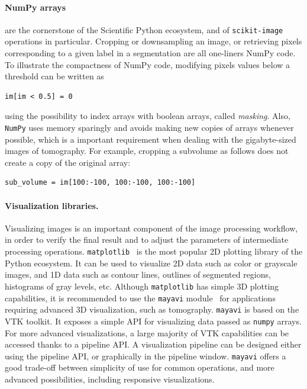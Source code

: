 \documentclass[twocolumn]{bmcart}%
\begin{document}
\paragraph{NumPy arrays} are the cornerstone of the Scientific Python
ecosystem, and of \texttt{scikit-image} operations in particular.
Cropping or downsampling an image, or retrieving pixels corresponding to
a given label in a segmentation are all one-liners NumPy code. To
illustrate the compactness of NumPy code, modifying pixels values below a
threshold can be written as
\begin{lstlisting}
im[im < 0.5] = 0
\end{lstlisting}
using the possibility to index arrays with boolean arrays, called
\emph{masking}. Also, \texttt{NumPy} uses memory sparingly and avoids
making new copies of arrays whenever possible, which is a important
requirement when dealing with the gigabyte-sized images of tomography.
For example, cropping a subvolume as follows does not create a copy of the
original array:
\begin{lstlisting}
sub_volume = im[100:-100, 100:-100, 100:-100]
\end{lstlisting}



\paragraph{Visualization libraries.}

Visualizing images is an important component of the image processing
workflow, in order to verify the final result and to adjust the
parameters of intermediate processing operations.
\texttt{matplotlib}~\citep{Hunter2007} is the most popular 2D plotting
library of the Python ecosystem. It can be used to visualize 2D data such
as color or grayscale images, and 1D data such as contour lines, outlines
of segmented regions, histograms of gray levels, etc. Although
\texttt{matplotlib} has simple 3D plotting capabilities, it is
recommended to use the \texttt{mayavi} module~\citep{Ramachandran2011}
for applications requiring advanced 3D visualization, such as tomography. 
\texttt{mayavi} is based on the VTK toolkit. It exposes a simple API for
visualizing data passed as \texttt{numpy} arrays. For more advanced
visualizations, a large majority of VTK capabilities can be accessed
thanks to a pipeline API. A visualization pipeline can be designed either
using the pipeline API, or graphically in the pipeline window.
\texttt{mayavi} offers a good trade-off between simplicity of use for
common operations, and more advanced possibilities, including responsive
visualizations.
\end{document}
